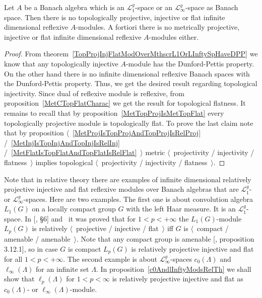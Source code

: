 \begin{corollary}\label{NoInfDimRefMetTopProjInjFlatModOverMthscrL1OrLInfty} Let
$A$ be a Banach algebra which is an $\mathscr{L}_1^g$-space or an 
$\mathscr{L}_\infty^g$-space as Banach space. Then there is no topologically
projective, injective or flat infinite dimensional reflexive $A$-modules. A
fortiori there is no metrically projective, injective or flat infinite
dimensional reflexive $A$-modules either.
\end{corollary}
\begin{proof} From theorem~\ref{TopProjInjFlatModOverMthscrL1OrLInftySpHaveDPP}
we know that any topologically injective $A$-module has the Dunford-Pettis
property. On the other hand there is no infinite dimensional reflexive Banach
spaces with the Dunford-Pettis property. Thus, we get the desired result
regarding topological injectivity. Since dual of reflexive module is reflexive,
from proposition~\ref{MetCTopFlatCharac} we get the result for topological
flatness. It remains to recall that by proposition~\ref{MetTopProjIsMetTopFlat}
every topologically projective module is topologically flat. To prove the last
claim note that by proposition $\langle$~\ref{MetProjIsTopProjAndTopProjIsRelProj}
/~\ref{MetInjIsTopInjAndTopInjIsRelInj}
/~\ref{MetFlatIsTopFlatAndTopFlatIsRelFlat}~$\rangle$ metric 
$\langle$~projectivity / injectivity / flatness~$\rangle$
implies topological $\langle$~projectivity / injectivity / flatness~$\rangle$.
\end{proof}

Note that in relative theory there are examples of infinite dimensional
relatively projective injective and flat reflexive modules over Banach algebras
that are $\mathscr{L}_1^g$- or $\mathscr{L}_\infty^g$-spaces. Here are two
examples. The first one is about convolution algebra $L_1(G)$ on a locally
compact group $G$ with the left Haar measure. It is an $\mathscr{L}_1^g$-space. In
[\cite{DalPolHomolPropGrAlg}, \S6] and~\cite{RachInjModAndAmenGr} it was proved
that for $1<p<+\infty$ the $L_1(G)$-module $L_p(G)$ is relatively
$\langle$~projective / injective / flat~$\rangle$ iff $G$ is $\langle$~compact /
amenable / amenable~$\rangle$. Note that any compact group is amenable
[\cite{PierAmenLCA}, proposition 3.12.1], so in case $G$ is compact $L_p(G)$ is
relatively projective injective and flat for all $1<p<+\infty$.  The second
example is about $\mathscr{L}_\infty^g$-spaces $c_0(\Lambda)$ and
$\ell_\infty(\Lambda)$ for an infinite set $\Lambda$. In
proposition~\ref{c0AndlInftyModsRelTh} we shall show that $\ell_p(\Lambda)$ for
$1<p<\infty$ is relatively projective injective and flat as $c_0(\Lambda)$- or
$\ell_\infty(\Lambda)$-module. 


